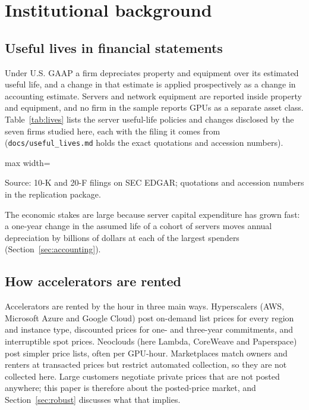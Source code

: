 \section{Institutional background}
\label{sec:background}

\subsection{Useful lives in financial statements}

Under U.S. GAAP a firm depreciates property and equipment over its estimated useful life, and a
change in that estimate is applied prospectively as a change in accounting estimate. Servers and
network equipment are reported inside property and equipment, and no firm in the sample reports
GPUs as a separate asset class. Table~\ref{tab:lives} lists the server useful-life policies and
changes disclosed by the seven firms studied here, each with the filing it comes from
(\texttt{docs/useful\_lives.md} holds the exact quotations and accession numbers).

\begin{table}[htbp]
\centering
\caption{Server useful-life policies and changes disclosed in SEC filings}
\label{tab:lives}
\begin{adjustbox}{max width=\textwidth}
\end{adjustbox}
\par\smallskip\footnotesize Source: 10-K and 20-F filings on SEC EDGAR; quotations and accession
numbers in the replication package.
\end{table}

The economic stakes are large because server capital expenditure has grown fast: a one-year
change in the assumed life of a cohort of servers moves annual depreciation by billions of dollars
at each of the largest spenders (Section~\ref{sec:accounting}).

\subsection{How accelerators are rented}

Accelerators are rented by the hour in three main ways. Hyperscalers (AWS, Microsoft Azure and
Google Cloud) post on-demand list prices for every region and instance type, discounted prices for
one- and three-year commitments, and interruptible spot prices. Neoclouds (here Lambda, CoreWeave
and Paperspace) post simpler price lists, often per GPU-hour. Marketplaces match owners and
renters at transacted prices but restrict automated collection, so they are not collected here.
Large customers negotiate private prices that are not posted anywhere; this paper is therefore
about the posted-price market, and Section~\ref{sec:robust} discusses what that implies.

